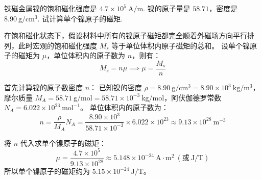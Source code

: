 \begin{exercise}\label{ex:19.7}
铁磁金属镍的饱和磁化强度是 $4.7 \times 10^5 \ \mathrm{A/m}$. 镍的原子量是 $58.71$，密度是 $8.90 \ \mathrm{g/cm^3}$. 试计算单个镍原子的磁矩.
\end{exercise}
\begin{solution}
在饱和磁化状态下，假设材料中所有的镍原子磁矩都完全顺着外磁场方向平行排列，此时宏观的饱和磁化强度 $M_s$ 等于单位体积内原子磁矩的总和。
设单个镍原子的磁矩为 $\mu$，单位体积内的原子数为 $n$，则有：
$$ M_s = n \mu \implies \mu = \frac{M_s}{n} $$

首先计算镍的原子数密度 $n$：
已知镍的密度 $\rho = 8.90 \ \mathrm{g/cm^3} = 8.90 \times 10^3 \ \mathrm{kg/m^3}$，摩尔质量 $M_A = 58.71 \ \mathrm{g/mol} = 58.71 \times 10^{-3} \ \mathrm{kg/mol}$，阿伏伽德罗常数 $N_A = 6.022 \times 10^{23} \ \mathrm{mol^{-1}}$。
单位体积内的原子数为：
$$ n = \frac{\rho}{M_A} N_A = \frac{8.90 \times 10^3}{58.71 \times 10^{-3}} \times 6.022 \times 10^{23} \approx 9.13 \times 10^{28} \ \mathrm{m^{-3}} $$

将 $n$ 代入求单个镍原子的磁矩：
$$ \mu = \frac{4.7 \times 10^5}{9.13 \times 10^{28}} \approx 5.148 \times 10^{-24} \ \mathrm{A \cdot m^2} \ (\text{或} \ \mathrm{J/T}) $$
所以单个镍原子的磁矩约为 $5.15 \times 10^{-24} \ \mathrm{J/T}$。
\end{solution}

